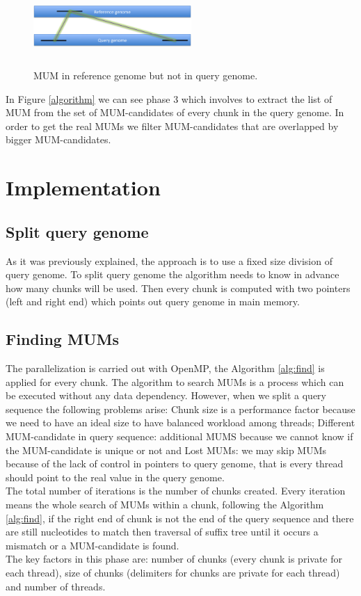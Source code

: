 \documentclass[3p,times]{elsarticle}
\begin{document}
\begin{figure}[htb]  
\begin{center} 
  \includegraphics[width=6cm,height=3cm]{Whole-MUM.png}
\end{center} 
\caption{MUM in reference genome but not in query genome.} 
\label{Whole-MUM} 
\end{figure}
In Figure \ref{algorithm} we can see phase 3 which involves to extract the list of MUM from the set of MUM-candidates of every chunk in the query genome. In order to get the real MUMs we filter MUM-candidates that are overlapped by bigger MUM-candidates.\\
\section{Implementation} 
\label{implementation}
\subsection*{Split query genome}  
As it was previously explained, the approach is to use a fixed size division of query genome. To split query genome the algorithm needs to know in advance how many chunks will be used. Then every chunk is computed with two pointers (left and right end) which points out query genome in main memory.
\subsection*{Finding MUMs}
The parallelization is carried out with OpenMP, the Algorithm \ref{alg:find} is applied for every chunk. The algorithm to search MUMs is a process which can be executed without any data dependency. However, when we split a query sequence the following problems arise: Chunk size is a performance factor because we need to have an ideal size to have balanced workload among threads; Different MUM-candidate in query sequence: additional MUMS because we cannot know if the MUM-candidate is unique or not and Lost MUMs: we may skip MUMs because of the lack of control in pointers to query genome, that is every thread should point to the real value in the query genome.\\
The total number of iterations is the number of chunks created. Every iteration means the whole search of MUMs within a chunk, following the Algorithm \ref{alg:find}, if the right end of chunk is not the end of the query sequence and there are still nucleotides to match then traversal of suffix tree until it occurs a mismatch or a MUM-candidate is found.\\
The key factors in this phase are: number of chunks (every chunk is private for each thread), size of chunks (delimiters for chunks are private for each thread) and number of threads.
\end{document}
